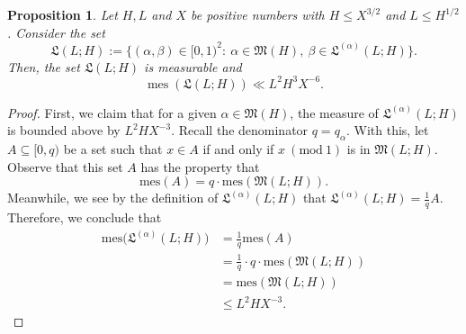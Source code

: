 \documentclass{amsart}%
\numberwithin{equation}{section}
\DeclareMathOperator{\mes}{mes}
\newtheorem{proposition}[theorem]{Proposition}
\theoremstyle{remark}
\newcommand{\1}{\mathbbm{1}}
\begin{document}
\begin{proposition}\label{pro5.2}
Let $H,L$ and $X$ be positive numbers with $H\leq X^{3/2}$ and $L\leq H^{1/2}$. 
  Consider the set
  \begin{equation*}
  \mathfrak{L}(L;H) :=  \{(\alpha,\beta)\in [0,1)^2:\ \alpha\in \mathfrak{M}(H),\ \beta\in \mathfrak{L}^{(\alpha)}(L;H)\}.
  \end{equation*}
  Then, the set  $\mathfrak{L}(L;H)$ is measurable and 
  \begin{equation*}
      \mes{\left(  \mathfrak{L}(L;H)\right)}\ll   L^2H^3X^{-6}.
  \end{equation*}
\end{proposition}
\begin{proof}
  First, we claim that for a given $\alpha\in \mathfrak{M}(H)$, the measure of $\mathfrak{L}^{(\alpha)}(L;H)$ is bounded above by $L^2HX^{-3}.$ %
Recall the denominator $q=q_{\alpha}.$ With this, let $A \subseteq[0,q)$ be a set such that $x \in A$ if and only if
 $x\ (\text{mod}\ 1)$ is in $\mathfrak{M}(L;H).$ Observe that this set $A$ has the property that 
    $$\text{mes}(A)=q\cdot\text{mes}(\mathfrak{M}(L;H)).$$ Meanwhile, we see by the definition of $\mathfrak{L}^{(\alpha)}(L;H)$ that $\mathfrak{L}^{(\alpha)}(L;H)=\frac{1}{q}A$. Therefore, we conclude that
    \begin{equation}\label{bound for the measure of LalphaL}
    \begin{aligned}
        \text{mes}\bigl(\mathfrak{L}^{(\alpha)}(L;H)\bigr)&=\frac{1}{q}\text{mes}(A)\\
        &=\frac{1}{q}\cdot q\cdot\text{mes}(\mathfrak{M}(L;H))\\
        &=\text{mes}(\mathfrak{M}(L;H))\\
        &\leq L^2HX^{-3}.
    \end{aligned}
    \end{equation}


\end{proof}
\end{document}

